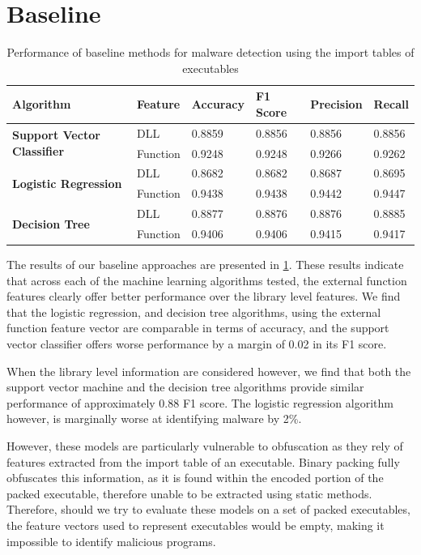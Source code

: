 \documentclass[main.tex]{subfiles}
\begin{document}
\section{Baseline}

\begin{table}[h]
    \centering
    \caption{Performance of baseline methods for malware detection using the import tables of executables}
    \begin{tabular}{llllll}
        \toprule
        \textbf{Algorithm} & \textbf{Feature} & \textbf{Accuracy} & \textbf{F1 Score} & \textbf{Precision} & \textbf{Recall} \\ \midrule
        \multirow{2}{*}{\textbf{Support Vector Classifier}} & DLL & 0.8859 & 0.8856 & 0.8856 & 0.8856 \\
        & Function & 0.9248 & 0.9248 & 0.9266 & 0.9262 \\ \midrule
        \multirow{2}{*}{\textbf{Logistic Regression}} & DLL & 0.8682 & 0.8682 & 0.8687 & 0.8695 \\
        & Function & 0.9438 & 0.9438 & 0.9442 & 0.9447 \\ \midrule
        \multirow{2}{*}{\textbf{Decision Tree}} & DLL & 0.8877 & 0.8876 & 0.8876 & 0.8885 \\
        & Function & 0.9406 & 0.9406 & 0.9415 & 0.9417 \\ \bottomrule
    \end{tabular}%
    \label{tab:baseline-results}
\end{table}

\noindent
The results of our baseline approaches are presented in \cref{tab:baseline-results}. These results indicate that across each of the machine learning algorithms tested, the external function features clearly offer better performance over the library level features. We find that the logistic regression, and decision tree algorithms, using the external function feature vector are comparable in terms of accuracy, and the support vector classifier offers worse performance by a margin of 0.02 in its F1 score. 

When the library level information are considered however, we find that both the support vector machine and the decision tree algorithms provide similar performance of approximately 0.88 F1 score. The logistic regression algorithm however, is marginally worse at identifying malware by 2\%. 

However, these models are particularly vulnerable to obfuscation as they rely of features extracted from the import table of an executable. Binary packing fully obfuscates this information, as it is found within the encoded portion of the packed executable, therefore unable to be extracted using static methods. Therefore, should we try to evaluate these models on a set of packed executables, the feature vectors used to represent executables would be empty, making it impossible to identify malicious programs. 
\end{document}
